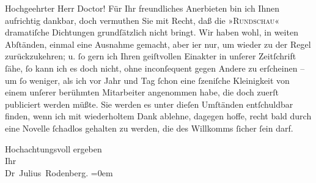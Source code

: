 \pstart{}Hochgeehrter Herr Doctor!\pend\vspace{0.5em}
\pstart
           Für Ihr freundliches Anerbieten bin ich Ihnen aufrichtig dankbar, doch vermuthen Sie
               mit Recht, daß die »\textsc{Rundschau}« dramatiſche Dichtungen grundſätzlich nicht bringt. Wir haben wohl, in weiten
               Abſtänden, einmal eine Ausnahme gemacht, aber i{\geminationm}er nur,
               um wieder zu der Regel zurückzukehren; u. ſo gern ich Ihren geiſtvollen Einakter in unſerer Zeitſchrift
               ſähe, ſo kann ich es doch nicht, ohne inconſequent gegen Andere zu erſcheinen – um ſo
               weniger, als ich vor Jahr und Tag ſchon eine ſzeniſche Kleinigkeit von einem unſerer
               berühmten Mitarbeiter angenommen habe, die doch zuerſt publiciert werden müßte. Sie
               werden es unter dieſen Umſtänden entſchuldbar finden, wenn ich mit wiederholtem Dank
               ablehne, dagegen hoffe, recht bald durch eine Novelle ſchadlos gehalten zu werden,
               die des Willkomms ſicher ſein darf.\pend
           
\pstart
           Hochachtungsvoll ergeben{\\[\baselineskip]}Ihr{\\[\baselineskip]}\spacefill\mbox{Dr Julius Rodenberg.}\pend
           \leftskip=0em{}\endnumbering{}  
      